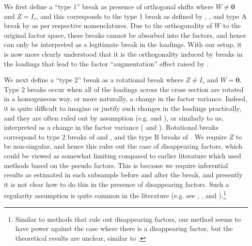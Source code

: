 \documentclass[12pt]{article}
\theoremstyle{plain}
\numberwithin{equation}{section}
\begin{document}
We first define a ``type 1'' break as presence of orthogonal shifts where $W \neq \mathbf{0}$ and $Z = I_r$, and this corresponds to the type 1 break as defined by \textcite{han_tests_2015}, \textcite{baltagi_identification_2017}, and type A break by \textcite{duan_quasi-maximum_2022} as per respective nomenclatures. Due to the orthogonality of $W$ to the original factor space, these breaks cannot be absorbed into the factors, and hence can only be interpreted as a legitimate break in the loadings. With our setup, it is now more clearly understood that it is the orthogonality induced by breaks in the loadings that lead to the factor ``augmentation'' effect raised by \textcite{breitung_testing_2011}.

We next define a ``type 2'' break as a rotational break where $Z \neq I_r$ and $W = \mathbf{0}$. Type 2 breaks occur when all of the loadings across the cross section are rotated in a homogeneous way, or more naturally, a change in the factor variance. Indeed, it is quite difficult to imagine or justify such changes in the loadings practically, and they are often ruled out by assumption (e.g. \textcite{chen_detecting_2014} and \textcite{ma_group_2022}), or similarly to us, interpreted as a change in the factor variance (\textcite{wang_identification_2021} and \textcite{pelger_state-varying_2022}). Rotational breaks correspond to type 2 breaks of \textcite{han_tests_2015} and \textcite{baltagi_identification_2017}, and the type B breaks of \textcite{duan_quasi-maximum_2022}.
We require $Z$ to be non-singular, and hence this rules out the case of disappearing factors, which could be viewed as somewhat limiting compared to earlier literature which used methods based on the pseudo factors. This is because we require inferential results as estimated in each subsample before and after the break, and presently it is not clear how to do this in the presence of disappearing factors. Such a regularity assumption is quite common in the literature (e.g. see \textcite{chen_detecting_2014}, \textcite{su_time-varying_2017}, \textcite{ma_estimation_2018} and \textcite{bai_estimation_2020}).\footnote{Similar to methods that rule out disappearing factors, our method seems to have power against the case where there is a disappearing factor, but the theoretical results are unclear, similar to \textcite{chen_detecting_2014}.} 
\end{document}
